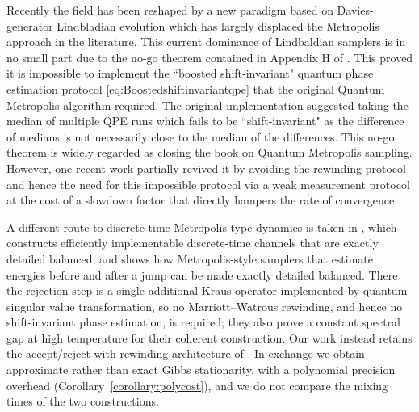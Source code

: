 \documentclass[aps,floatfix,10pt,amssymb,amsfont,amsmath,superscriptaddress,float,nofootinbib,longbibliography,nobalancelastpage,twocolumn]{revtex4-2}
\begin{document}
Recently the field has been reshaped by a new paradigm based on Davies-generator Lindbladian evolution \cite{chen2023quantumthermalstatepreparation,Kastoryano2014QuantumGS,shtanko2021preparing,chen2021fast,chen2023efficient,rall2023thermal,gilyen2024quantum,ding2025efficient,ding2025end,guo2025designing,chen2025efficient, hahn2026efficient, scandi2026thermalization,leng2026accelerating,rouze2026optimal,lloyd2026quantum,Rouz__2026} which has largely displaced the Metropolis approach in the literature. This current dominance of Lindbaldian samplers is in no small part due to the no-go theorem contained in Appendix H of \cite{chen2023quantumthermalstatepreparation}. This proved it is impossible to implement the ``boosted shift-invariant" quantum phase estimation protocol \eqref{eq:Boostedshiftinvariantqpe} that the original Quantum Metropolis algorithm required.  The original implementation \cite{Temme_2011} suggested taking the median of multiple QPE runs which fails to be ``shift-invariant" as the difference of medians is not necessarily close to the median of the differences. This no-go theorem is widely regarded as closing the book on Quantum Metropolis sampling. However, one recent work \cite{jiang2024quantummetropolissamplingweak} partially revived it by avoiding the rewinding protocol and hence the need for this impossible protocol via a weak measurement protocol at the cost of a slowdown factor that directly hampers the rate of convergence.

A different route to discrete-time Metropolis-type dynamics is taken in \cite{gilyen2024quantum}, which constructs efficiently implementable discrete-time channels that are exactly detailed balanced, and shows how Metropolis-style samplers that estimate energies before and after a jump can be made exactly detailed balanced. There the rejection step is a single additional Kraus operator implemented by quantum singular value transformation, so no Marriott--Watrous rewinding, and hence no shift-invariant phase estimation, is required; they also prove a constant spectral gap at high temperature for their coherent construction. Our work instead retains the accept/reject-with-rewinding architecture of \cite{Temme_2011}. In exchange we obtain approximate rather than exact Gibbs stationarity, with a polynomial precision overhead (Corollary~\ref{corollary:polycost}), and we do not compare the mixing times of the two constructions.
\end{document}
